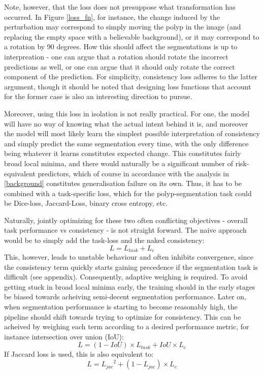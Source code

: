     Note, however, that the loss does not presuppose what transformation has occurred. In Figure \ref{loss_fn}, for instance, the change induced by the perturbation may correspond to simply moving the polyp in the image (and replacing the empty space with a believable background), or it may correspond to a rotation by 90 degrees. How this should affect the segmentations is up to interpreation - one can argue that a rotation should rotate the incorrect predictions as well, or one can argue that it should only rotate the correct component of the prediction. For simplicity, consistency loss adheres to the latter argument, though it should be noted that designing loss functions that account for the former case is also an interesting direction to pursue. 
	
	Moreover, using this loss in isolation is not really practical. For one, the model will have no way of knowing what the actual intent behind it is, and moreover the model will most likely learn the simplest possible interpretation of consistency and simply predict the same segmentation every time, with the only difference being whatever it learns constitutes expected change. This constitutes fairly broad local minima, and there would naturally be a significant number of risk-equivalent predictors, which of course in accordance with the analysis in \ref{background} constitutes generalisation failure on its own. Thus, it has to be combined with a task-specific loss, which for the polyp-segmentation task could be Dice-loss, Jaccard-Loss, binary cross entropy, etc. 
	
	Naturally, jointly optimizing for these two often conflicting objectives - overall task performance vs consistency - is not straight forward. The naive approach would be to simply add the task-loss and the naked consistency:
    \begin{equation}
		L = L_{task} + L_c
	\end{equation}
	This, however, leads to unstable behaviour and often inhibits convergence, since the consistency term quickly starts gaining precedence if the segmentation task is difficult (see appendix). Consequently, adaptive weighing is required. To avoid getting stuck in broad local minima early, the training should in the early stages be biased towards acheiving semi-decent segmentation performance. Later on, when segmentation performance is starting to become reasonably high, the pipeline should shift towards trying to optimize for consistency. This can be acheived by weighing each term according to a desired performance metric, for instance intersection over union (IoU):
	\begin{equation}
		L = (1-IoU)\times L_{task} + IoU \times L_c
	\end{equation}
	If Jaccard loss is used, this is also equivalent to:
	\begin{equation}
		L = {L_{jac}}^2 + (1-L_{jac})\times L_c
	\end{equation}
	

